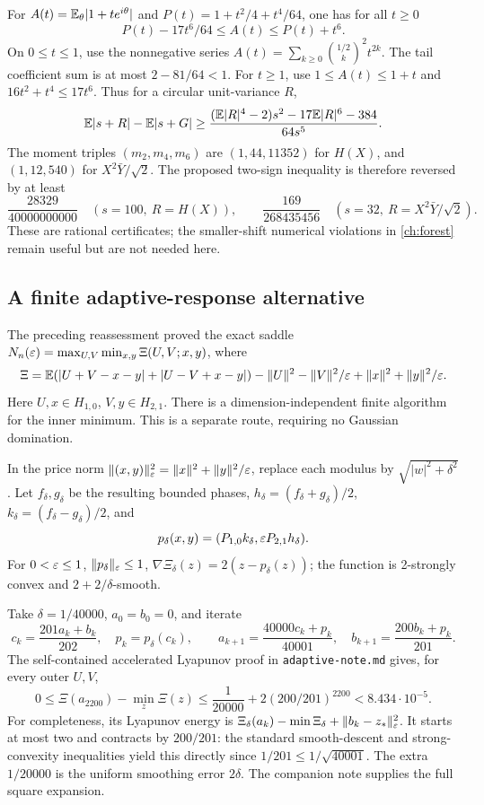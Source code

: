 For \(A(t)=\mathbb E_\theta|1+te^{i\theta}|\) and
\(P(t)=1+t^2/4+t^4/64\), one has for all \(t\ge0\)
\[
P(t)-17t^6/64\le A(t)\le P(t)+t^6.
\]
On \(0\le t\le1\), use the nonnegative series
\(A(t)=\sum_{k\ge0}\binom{1/2}{k}^2t^{2k}\).
The tail coefficient sum is at most \(2-81/64<1\).
For \(t\ge1\), use \(1\le A(t)\le1+t\) and
\(16t^2+t^4\le17t^6\).
Thus for a circular unit-variance \(R\),
\[
\mathbb E|s+R|-\mathbb E|s+G|
\ge\frac{(\mathbb E|R|^4-2)s^2-17\mathbb E|R|^6-384}{64s^5}.
\]
The moment triples \((m_2,m_4,m_6)\) are
\((1,44,11352)\) for \(H(X)\), and \((1,12,540)\) for
\(X^2\bar Y/\sqrt2\).
The proposed two-sign inequality is therefore reversed by at least
\[
\frac{28329}{40000000000}\quad(s=100,\ R=H(X)),\qquad
\frac{169}{268435456}\quad(s=32,\ R=X^2\bar Y/\sqrt2).
\]
These are rational certificates; the smaller-shift numerical
violations in \autoref{ch:forest} remain useful but are not needed here.

\subsection{A finite adaptive-response alternative}

The preceding reassessment proved the exact saddle
\(N_n(\varepsilon)=\max_{U,V}\min_{x,y}\Xi(U,V;x,y)\), where
\[
\Xi=\mathbb E(|U+V-x-y|+|U-V+x-y|)
-\|U\|^2-\|V\|^2/\varepsilon+\|x\|^2+\|y\|^2/\varepsilon.
\]
Here \(U,x\in H_{1,0}\), \(V,y\in H_{2,1}\).
There is a dimension-independent finite algorithm for the inner
minimum. This is a separate route, requiring no Gaussian domination.

In the price norm \(\|(x,y)\|_\varepsilon^2=\|x\|^2+\|y\|^2/\varepsilon\),
replace each modulus by \(\sqrt{|w|^2+\delta^2}\).
Let \(f_\delta,g_\delta\) be the resulting bounded phases,
\(h_\delta=(f_\delta+g_\delta)/2\),
\(k_\delta=(f_\delta-g_\delta)/2\), and
\[
p_\delta(x,y)=(P_{1,0}k_\delta,\varepsilon P_{2,1}h_\delta).
\]
For \(0<\varepsilon\le1\), \(\|p_\delta\|_\varepsilon\le1\),
\(\nabla\Xi_\delta(z)=2(z-p_\delta(z))\);
the function is 2-strongly convex and \(2+2/\delta\)-smooth.

Take \(\delta=1/40000\), \(a_0=b_0=0\), and iterate
\[
c_k=\frac{201a_k+b_k}{202},\quad p_k=p_\delta(c_k),\qquad
a_{k+1}=\frac{40000c_k+p_k}{40001},\quad
b_{k+1}=\frac{200b_k+p_k}{201}.
\]
The self-contained accelerated Lyapunov proof in
\texttt{adaptive-note.md} gives, for every outer \(U,V\),
\[
0\le\Xi(a_{2200})-\min_z\Xi(z)
\le\frac1{20000}+2(200/201)^{2200}<8.434\cdot10^{-5}.
\]
For completeness, its Lyapunov energy is
\(\Xi_\delta(a_k)-\min\Xi_\delta+\|b_k-z_*\|_\varepsilon^2\).
It starts at most two and contracts by \(200/201\): the standard
smooth-descent and strong-convexity inequalities yield this directly
since \(1/201\le1/\sqrt{40001}\).
The extra \(1/20000\) is the uniform smoothing error \(2\delta\).
The companion note supplies the full square expansion.

